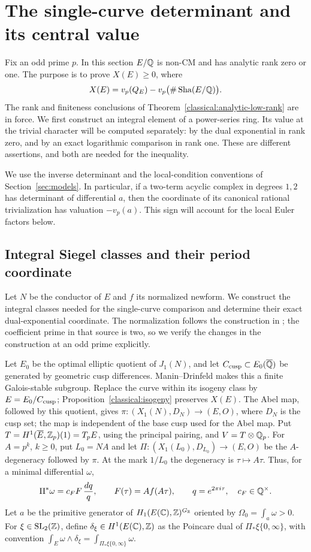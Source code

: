 \section{The single-curve determinant and its central value}\label{sec:single}

Fix an odd prime \(p\).  In this section \(E/\mathbb Q\) is non-CM and has
analytic rank zero or one.  The purpose is to prove
\(X(E)\geq0\), where
\[
 X(E)=v_p(Q_E)-v_p\bigl(\#\operatorname{Sha}(E/\mathbb Q)\bigr).
\]
The rank and finiteness conclusions of
Theorem~\ref{classical:analytic-low-rank} are in force.
We first construct an integral element of a power-series
ring.  Its value at the trivial character will be computed separately:
by the dual exponential in rank zero, and by an exact logarithmic
comparison in rank one.  These are different assertions, and both are
needed for the inequality.

We use the inverse determinant and the local-condition conventions of
Section~\ref{sec:models}.  In particular, if a two-term acyclic complex
in degrees \(1,2\) has determinant of differential \(a\), then the
coordinate of its canonical rational trivialization has valuation
\(-v_p(a)\).  This sign will account for the local Euler factors below.

\subsection{Integral Siegel classes and their period coordinate}
\label{single:siegel}

Let \(N\) be the conductor of \(E\) and \(f\) its normalized
newform.  We construct the integral
classes needed for the single-curve comparison and determine their exact
dual-exponential coordinate.  The normalization follows the construction
in \cite[Section~4]{B}; the coefficient prime in that source is two, so
we verify the changes in the construction at an odd prime explicitly.

Let \(E_0\) be the optimal elliptic quotient of \(J_1(N)\), and let
\(C_{\rm cusp}\subset E_0(\overline{\mathbb Q})\) be generated by geometric
cusp differences.  Manin--Drinfeld makes this a finite Galois-stable
subgroup.  Replace the curve within its isogeny class by
\(E=E_0/C_{\rm cusp}\); Proposition~\ref{classical:isogeny} preserves
\(X(E)\).  The Abel map, followed by this quotient, gives
\(\pi:(X_1(N),D_N)\longrightarrow(E,O)\), where \(D_N\) is the cusp set;
the map is independent of the base cusp used for the Abel map.
Put \(T=H^1(\overline E,\mathbb Z_p)(1)=T_pE\), using the principal pairing,
and \(V=T\otimes\mathbb Q_p\).
For \(A=p^k\), \(k\geq0\), put \(L_0=NA\) and let
\(\Pi:(X_1(L_0),D_{L_0})\to(E,O)\) be the \(A\)-degeneracy followed
by \(\pi\).  At the mark \(1/L_0\) the degeneracy is
\(\tau\mapsto A\tau\).  Thus, for a minimal differential \(\omega\),
\[
 \Pi^*\omega=c_FF\,\frac{dq}{q},\qquad
 F(\tau)=Af(A\tau),\qquad q=e^{2\pi i\tau},\quad c_F\in\mathbb Q^\times.
\]
Let \(a\) be the primitive generator of
\(H_1(E(\mathbb C),\mathbb Z)^{G_{\mathbb R}}\) oriented by
\(\Omega_0=\int_a\omega>0\).  For \(\xi\in\mathrm{SL}_2(\mathbb Z)\),
define \(\delta_\xi\in H^1(E(\mathbb C),\mathbb Z)\) as the Poincare dual of
\(\Pi_*\xi\{0,\infty\}\), with convention
\(\int_E\omega\wedge\delta_\xi=\int_{\Pi_*\xi\{0,\infty\}}\omega\).

